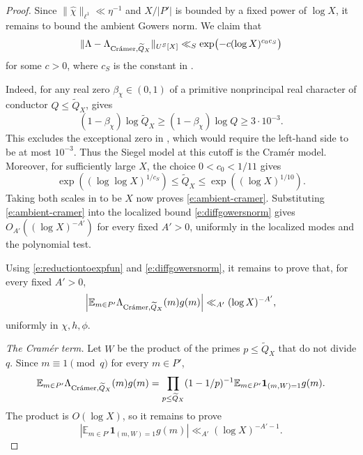 \documentclass[12pt]{amsart}
\newcommand{\1}{\mathbf 1}
\newcommand{\Cramer}{\textup{Cr\'amer}}
\theoremstyle{definition}
\begin{document}
\begin{proof}
Since \(\|\widehat\chi\|_{\ell^1}\ll\eta^{-1}\) and \(X/|P'|\) is
bounded by a fixed power of \(\log X\), it remains to bound the
ambient Gowers norm. We claim that
\begin{equation}\label{e:ambient-cramer}
 \|\Lambda-\Lambda_{\Cramer,\widetilde Q_X}\|_{U^S[X]}
 \ll_S\exp\bigl(-c(\log X)^{c_0c_S}\bigr)
\end{equation}
for some \(c>0\), where \(c_S\) is the constant in
\cite[Lemma~3.1]{KMTT}.

Indeed, for any real zero \(\beta_\chi\in(0,1)\) of a primitive
nonprincipal real character of conductor \(Q\leq\widetilde Q_X\),
\cite[Theorem~1.1]{BanksSiegel} gives
\[
 (1-\beta_\chi)\log\widetilde Q_X
 \geq (1-\beta_\chi)\log Q
 \geq 3\cdot10^{-3}.
\]
This excludes the exceptional zero in \cite[Definition~2.3]{KMTT},
which would require the left-hand side to be at most \(10^{-3}\).
Thus the Siegel model at this cutoff is the Cram\'er model.
Moreover, for sufficiently large \(X\), the choice \(0<c_0<1/11\)
gives
\[
 \exp((\log\log X)^{1/c_S})
 \leq \widetilde Q_X
 \leq \exp((\log X)^{1/10}).
\]
Taking both scales in \cite[Lemma~3.1]{KMTT} to be \(X\) now
proves \eqref{e:ambient-cramer}.
Substituting \eqref{e:ambient-cramer} into the localized bound \eqref{e:diffgowersnorm}
gives \(O_{A'}((\log X)^{-A'})\) for every fixed \(A'>0\),
uniformly in the localized modes and the polynomial test.

Using \eqref{e:reductiontoexpfun} and \eqref{e:diffgowersnorm}, it remains to prove that, for every fixed \(A'>0\),
\begin{align}\label{e:cramerreduest}
     \left|\mathbb E_{m\in P'}
   \Lambda_{\Cramer,\widetilde Q_X}(m)g(m)\right|
 \ll_{A'}(\log X)^{-A'},
\end{align}
uniformly in \(\chi,h,\phi\). 

\medskip
\noindent\emph{The Cram\'er term.}
Let $W$ be the product of the primes $p\leq\widetilde Q_X$ that
do not divide $q$. Since $m\equiv1\pmod q$ for every $m\in P'$,
\[
 \mathbb E_{m\in P'}
 \Lambda_{\Cramer,\widetilde Q_X}(m)g(m)
 =
 \prod_{p\leq\widetilde Q_X}(1-1/p)^{-1}
 \mathbb E_{m\in P'}\mathbf1_{(m,W)=1}g(m).
\]
The product is $O(\log X)$, so it remains to prove
\[
 \left|\mathbb E_{m\in P'}\mathbf1_{(m,W)=1}g(m)\right|
 \ll_{A'}(\log X)^{-A'-1}.
\]


\end{proof}
\end{document}
